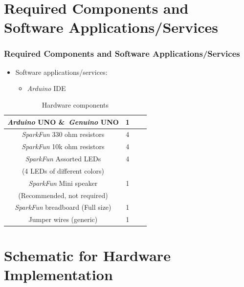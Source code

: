 \documentclass[xcolor={usenames,dvipsnames},hyperref={hyperindex,bookmarks}]{beamer}
\begin{document}
\section{Required Components and Software Applications/Services}


\frame
{
	\frametitle{Required Components and Software Applications/Services}

	\begin{itemize}
	\item Software applications/services:
		\begin{itemize}
		\item {\it Arduino} IDE
		\end{itemize}
	\end{itemize}

	\begin{table}[htdp]
\caption{Hardware components}
\label{tab:Table}
	\begin{center}
		\begin{tabular}{|c|c|c|c|}
		\hline
		{\it Arduino} UNO {\rm \&}\ {\it Genuino} UNO & 1 \\
		\hline
		{\it SparkFun} 330 ohm resistors & 4 \\
		\hline
		{\it SparkFun} 10k ohm resistors & 4 \\
		\hline
		{\it SparkFun} Assorted LEDs & 4 \\
		(4 LEDs of different colors) & \\
		\hline
		{\it SparkFun} Mini speaker & 1 \\
		(Recommended, not required) & \\
		\hline
		{\it SparkFun} breadboard (Full size) & 1 \\
		\hline
		Jumper wires (generic) & 1 \\
		\hline
		\end{tabular}
	\end{center}
\end{table}

}


\section{Schematic for Hardware Implementation}
\end{document}
